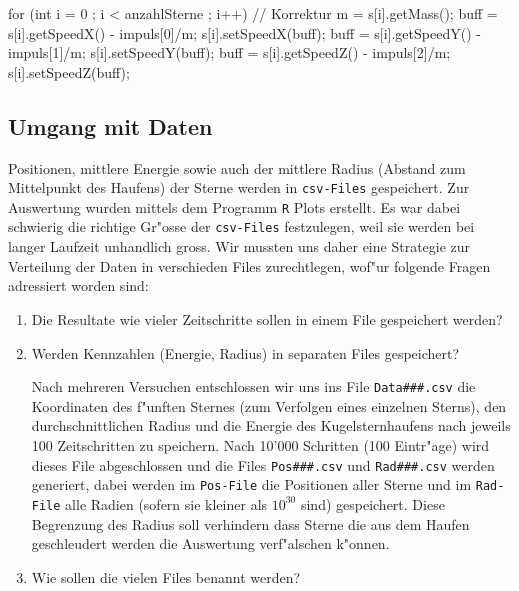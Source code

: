 \begin{refsection}
\begin{Cpp}
for (int i = 0 ; i < anzahlSterne ; i++){	// Korrektur 
	m = s[i].getMass();
	buff = s[i].getSpeedX() - impuls[0]/m;
	s[i].setSpeedX(buff);
	buff = s[i].getSpeedY() - impuls[1]/m;
	s[i].setSpeedY(buff);
	buff = s[i].getSpeedZ() - impuls[2]/m;
	s[i].setSpeedZ(buff);
}
\end{Cpp}	
	
\subsection{Umgang mit Daten}
Positionen, mittlere Energie sowie auch der mittlere Radius (Abstand
zum Mittelpunkt des Haufens) der Sterne werden in \texttt{csv-Files}
gespeichert. Zur Auswertung wurden mittels dem Programm \texttt{R}
Plots erstellt. Es war dabei schwierig die richtige Gr"osse der
\texttt{csv-Files} festzulegen, weil sie werden bei langer Laufzeit
unhandlich gross. Wir mussten uns daher eine Strategie zur Verteilung
der Daten in verschieden Files zurechtlegen, wof"ur folgende Fragen
adressiert worden sind:
\begin{enumerate}
\item Die Resultate wie vieler Zeitschritte sollen in einem File
gespeichert werden?
\item Werden Kennzahlen (Energie, Radius) in separaten Files
gespeichert?

Nach mehreren Versuchen entschlossen wir uns ins File
\texttt{Data\#\#\#.csv} die Koordinaten des f"unften Sternes
(zum Verfolgen eines einzelnen Sterns), den durchschnittlichen
Radius und die Energie des Kugelsternhaufens nach jeweils 100
Zeitschritten zu speichern. Nach 10'000 Schritten (100 Eintr"age)
wird dieses File abgeschlossen und die Files \texttt{Pos\#\#\#.csv} und
\texttt{Rad\#\#\#.csv} werden generiert, dabei werden im \texttt{Pos-File}
die Positionen aller Sterne und im \texttt{Rad-File} alle Radien (sofern
sie kleiner als $\mathrm{10^{30}}$ sind) gespeichert. Diese Begrenzung
des Radius soll verhindern dass Sterne die aus dem Haufen geschleudert
werden die Auswertung verf"alschen k"onnen.
\item Wie sollen die vielen Files benannt werden?


\end{enumerate}
\end{refsection}
